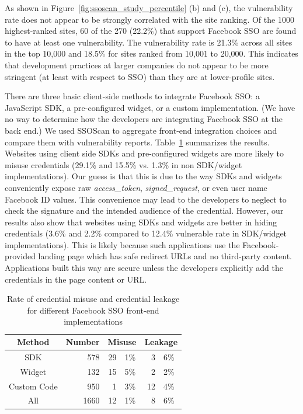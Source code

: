As shown in Figure~\ref{fig:ssoscan_study_percentile} (b) and (c), the vulnerability rate does not appear to be strongly correlated with the site ranking.  Of the 1000 highest-ranked sites, 60 of the 270 (22.2\%) that support Facebook SSO are found to have at least one vulnerability.  The vulnerability rate is 21.3\% across all sites in the top 10,000 and 18.5\% for sites ranked from 10,001 to 20,000.  This indicates that development practices at larger companies do not appear to be more stringent (at least with respect to SSO) than they are at lower-profile sites.

 There are three basic client-side methods to integrate Facebook SSO: a JavaScript SDK, a pre-configured widget, or a custom implementation.  (We have no way to determine how the developers are integrating Facebook SSO at the back end.)  We used SSOScan to aggregate front-end integration choices and compare them with vulnerability reports.  Table~\ref{tab:ssoscan_study_front-end} summarizes the results.  Websites using client side SDKs and pre-configured widgets are more likely to misuse credentials (29.1\% and 15.5\% vs. 1.3\% in non SDK/widget implementations).  Our guess is that this is due to the way SDKs and widgets conveniently expose raw \emph{access\_token}, \emph{signed\_request}, or even user name Facebook ID values.  This convenience may lead to the developers to neglect to check the signature and the intended audience of the credential.  However, our results also show that websites using SDKs and widgets are better in hiding credentials (3.6\% and 2.2\% compared to 12.4\% vulnerable rate in SDK/widget implementations).  This is likely because such applications use the Facebook-provided landing page which has safe redirect URLs and no third-party content.  Applications built this way are secure unless the developers explicitly add the credentials in the page content or URL.

\begin{table}[b]\centering
\begin{threeparttable}
\begin{tabular}{|c|r|r@{.}l|r@{.}l|}
\multicolumn{1}{c}{Method} & \multicolumn{1}{c}{Number} & \multicolumn{2}{c}{Misuse} & \multicolumn{2}{c}{Leakage} \\
\hline
SDK & 578 & 29 & 1\% & 3 & 6\%\\
\hline
Widget & 132 & 15 & 5\% & 2 & 2\%\\
\hline
Custom Code & 950 & 1 & 3\% & 12 & 4\%\\
\hline\hline %
All & 1660  & 12 & 1\% & 8 & 6\%\\
\hline
\end{tabular}
\end{threeparttable}
\caption{Rate of credential misuse and credential leakage for different Facebook SSO front-end implementations}
\label{tab:ssoscan_study_front-end}
\end{table}

